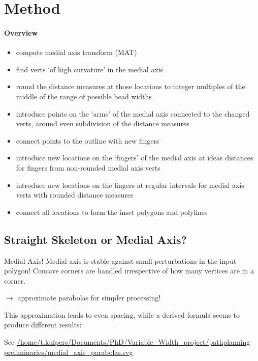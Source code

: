 \section{Method}
\paragraph{Overview}
\begin{itemize}
\item compute medial axis transform (MAT)
\item find verts `of high curvature' in the medial axis
\item round the distance measures at those locations to integer multiples of the middle of the range of possible bead widths
\item introduce points on the `arms' of the medial axis connected to the changed verts, around even subdivision of the distance measures
\item connect points to the outline with new fingers
\item introduce new locations on the `fingers' of the medial axis at ideas distances for fingers from non-rounded medial axis verts
\item introduce new locations on the fingers at regular intervals for medial axis verts with rounded distance measures
\item connect all locations to form the inset polygons and polylines
\end{itemize}


\subsection{Straight Skeleton or Medial Axis?}
Medial Axis!
Medial axis is stable against small perturbations in the input polygon!
Concave corners are handled irrespective of how many vertices are in a corner.


$\to$ approximate parabolas for simpler processing!

This approximation leads to even spacing,
while a derived formula seems to produce different results:

See \url{/home/t.kuipers/Documents/PhD/Variable_Width_project/pathplanning preliminaries/medial_axis_parabolas.svg}


